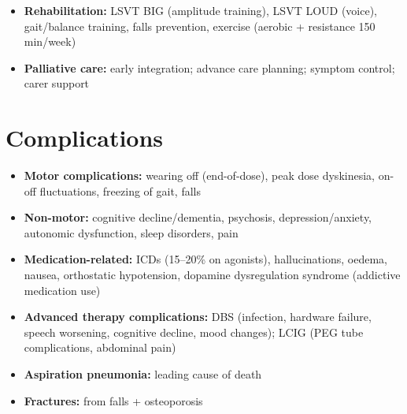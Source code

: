 \begin{itemize}
    \begin{itemize}
        \item Depression/anxiety: SSRI/SNRI; avoid paroxetine (anticholinergic); CBT
        \item Psychosis: reduce/stop anticholinergics, amantadine, dopamine agonists; quetiapine/clozapine (low dose); pimavanserin (5-HT2A inverse agonist, approved for PD psychosis)
        \item Orthostatic hypotension: fluid/salt, compression stockings, midodrine, fludrocortisone, droxidopa
        \item Constipation: fibre, fluids, exercise, laxatives (osmotic, stimulant); prokinetics (prucalopride)
        \item RBD: melatonin, clonazepam
        \item Dementia: rivastigmine (only approved cholinesterase inhibitor for PDD); donepezil, galantamine off-label; memantine
        \item ICDs: reduce/stop dopamine agonist; CBT; consider DBS
    \end{itemize}
    \item \textbf{Rehabilitation:} LSVT BIG (amplitude training), LSVT LOUD (voice), gait/balance training, falls prevention, exercise (aerobic + resistance 150 min/week)
    \item \textbf{Palliative care:} early integration; advance care planning; symptom control; carer support
\end{itemize}

\section*{Complications}
\begin{itemize}
    \item \textbf{Motor complications:} wearing off (end-of-dose), peak dose dyskinesia, on-off fluctuations, freezing of gait, falls
    \item \textbf{Non-motor:} cognitive decline/dementia, psychosis, depression/anxiety, autonomic dysfunction, sleep disorders, pain
    \item \textbf{Medication-related:} ICDs (15--20\% on agonists), hallucinations, oedema, nausea, orthostatic hypotension, dopamine dysregulation syndrome (addictive medication use)
    \item \textbf{Advanced therapy complications:} DBS (infection, hardware failure, speech worsening, cognitive decline, mood changes); LCIG (PEG tube complications, abdominal pain)
    \item \textbf{Aspiration pneumonia:} leading cause of death
    \item \textbf{Fractures:} from falls + osteoporosis
\end{itemize}

